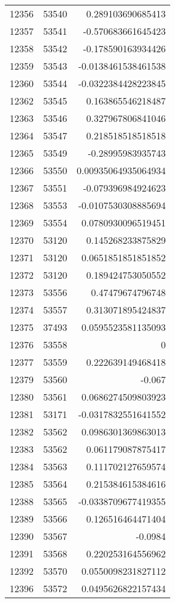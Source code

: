 \begin{tabular}{r | r | r}
12356 & 53540 & 0.289103690685413 \\
12357 & 53541 & -0.570683661645423 \\
12358 & 53542 & -0.178590163934426 \\
12359 & 53543 & -0.0138461538461538 \\
12360 & 53544 & -0.0322384428223845 \\
12362 & 53545 & 0.163865546218487 \\
12363 & 53546 & 0.327967806841046 \\
12364 & 53547 & 0.218518518518518 \\
12365 & 53549 & -0.28995983935743 \\
12366 & 53550 & 0.00935064935064934 \\
12367 & 53551 & -0.079396984924623 \\
12368 & 53553 & -0.0107530308885694 \\
12369 & 53554 & 0.0780930096519451 \\
12370 & 53120 & 0.145268233875829 \\
12371 & 53120 & 0.0651851851851852 \\
12372 & 53120 & 0.189424753050552 \\
12373 & 53556 & 0.47479674796748 \\
12374 & 53557 & 0.313071895424837 \\
12375 & 37493 & 0.0595523581135093 \\
12376 & 53558 & 0 \\
12377 & 53559 & 0.222639149468418 \\
12379 & 53560 & -0.067 \\
12380 & 53561 & 0.0686274509803923 \\
12381 & 53171 & -0.0317832551641552 \\
12382 & 53562 & 0.0986301369863013 \\
12383 & 53562 & 0.061179087875417 \\
12384 & 53563 & 0.111702127659574 \\
12385 & 53564 & 0.215384615384616 \\
12388 & 53565 & -0.0338709677419355 \\
12389 & 53566 & 0.126516464471404 \\
12390 & 53567 & -0.0984 \\
12391 & 53568 & 0.220253164556962 \\
12392 & 53570 & 0.0550098231827112 \\
12396 & 53572 & 0.0495626822157434 \\

\end{tabular}
